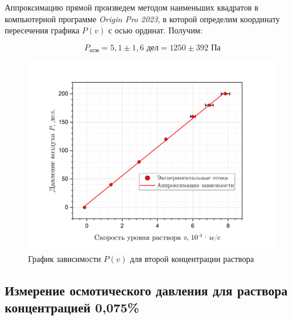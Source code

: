 \documentclass[a4paper, 12pt]{article}
\begin{document}
        \noindent Аппроксимацию прямой произведем методом наименьших квадратов в компьютерной программе \textit{Origin Pro 2023}, в которой определим координату пересечения графика $P(v)$ с осью ординат. Получим:

        $$
        \boxed{P_\text{осм} = 5,1 \pm 1,6 \text{ дел} = 1250 \pm 392 \text{ Па}}
        $$

        \begin{figure}[H]
            \centering
            \includegraphics[width = 14 cm]{images/graph_15per.png}
            \caption{График зависимости $P(v)$ для второй концентрации раствора}
            \label{graph:15per}
        \end{figure}

        \subsection{Измерение осмотического давления для раствора концентрацией 0,075\%}
        
\end{document}
